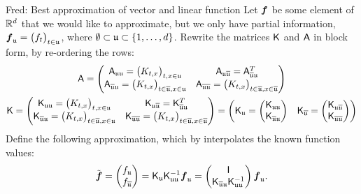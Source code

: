 \documentclass[reqno]{amsart}
\newcommand{\FredNote}[1]{{\color{blue}Fred: #1}}
\begin{document}
\FredNote{Best approximation of vector and linear function }
Let $\boldsymbol{f}$ be some element of $\mathbb{R}^d$ that we would like to approximate, but we only have partial information, $\boldsymbol{f}_{\mathfrak{u}} = \bigl( f_t \bigr)_{t \in \mathfrak{u}}$, where $\emptyset \subset \mathfrak{u} \subset \{1, \ldots, d\}$.  Rewrite the matrices $\mathsf{K}$ and $\mathsf{A}$ in block form, by re-ordering the rows:
\begin{gather*}
\mathsf{A} = \begin{pmatrix}
\mathsf{A}_{\mathfrak{u} \mathfrak{u}} = \bigl(K_{t,x} \bigr)_{t,x \in \mathfrak{u}} & 
\mathsf{A}_{\mathfrak{u} \overline{\mathfrak{u}}} = \mathsf{A}_{\overline{\mathfrak{u}} \mathfrak{u}}^T \\
\mathsf{A}_{\overline{\mathfrak{u}} \mathfrak{u}} = \bigl(K_{t,x} \bigr)_{t \in \overline{\mathfrak{u}},x \in \mathfrak{u}} &
\mathsf{A}_{\overline{\mathfrak{u}} \overline{\mathfrak{u}}} = \bigl(K_{t,x} \bigr)_{t \in \overline{\mathfrak{u}},x \in \overline{\mathfrak{u}}}
\end{pmatrix} \\
\mathsf{K} = \begin{pmatrix}
\mathsf{K}_{\mathfrak{u} \mathfrak{u}} = \bigl(K_{t,x} \bigr)_{t,x \in \mathfrak{u}} & 
\mathsf{K}_{\mathfrak{u} \overline{\mathfrak{u}}} = \mathsf{K}_{\overline{\mathfrak{u}} \mathfrak{u}}^T \\
\mathsf{K}_{\overline{\mathfrak{u}} \mathfrak{u}} = \bigl(K_{t,x} \bigr)_{t \in \overline{\mathfrak{u}},x \in \mathfrak{u}} &
\mathsf{K}_{\overline{\mathfrak{u}} \overline{\mathfrak{u}}} = \bigl(K_{t,x} \bigr)_{t \in \overline{\mathfrak{u}},x \in \overline{\mathfrak{u}}}
\end{pmatrix} = 
\begin{pmatrix} \mathsf{K}_{\mathfrak{u}} = \begin{pmatrix}
\mathsf{K}_{\mathfrak{u} \mathfrak{u}} \\ \mathsf{K}_{\overline{\mathfrak{u}} \mathfrak{u}} 
\end{pmatrix} & \mathsf{K}_{\overline{\mathfrak{u}}} = \begin{pmatrix}
\mathsf{K}_{\mathfrak{u} \overline{\mathfrak{u}}} \\ \mathsf{K}_{\overline{\mathfrak{u}} \overline{\mathfrak{u}}}
\end{pmatrix} \end{pmatrix}
\end{gather*}
Define the following approximation, which  by interpolates the known function values:
\begin{equation*}
    \tilde{\boldsymbol{f}} = \begin{pmatrix} f_{\mathfrak{u}} \\ f_{\overline{\mathfrak{u}}} \end{pmatrix}
    = \mathsf{K}_{\mathfrak{u}} \mathsf{K}^{-1}_{\mathfrak{u}\mathfrak{u}} \boldsymbol{f}_{\mathfrak{u}} 
    = 
    \begin{pmatrix} \mathsf{I} \\ \mathsf{K}_{\overline{\mathfrak{u}} \mathfrak{u} } \mathsf{K}_{\mathfrak{u}\mathfrak{u}}^{-1} \end{pmatrix} 
    \boldsymbol{f}_{\mathfrak{u}}.
\end{equation*}
\end{document}
